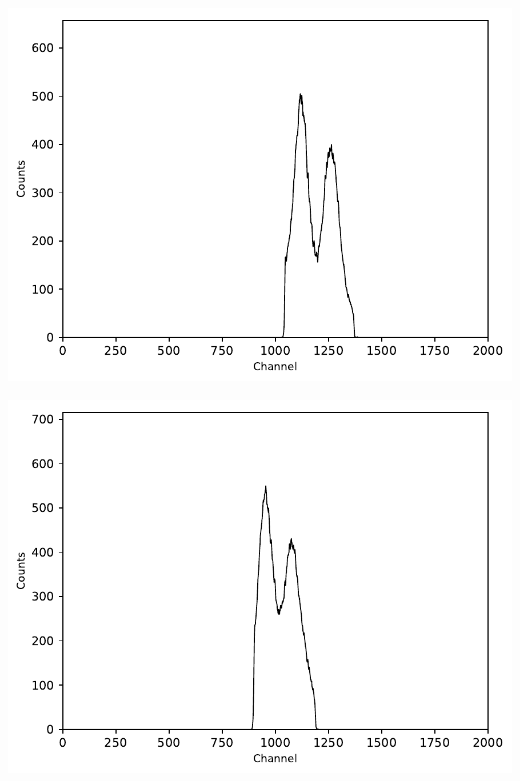 \begin{multicols}{2}
\begin{center}
\begin{adjustbox}{max width=\linewidth, keepaspectratio}
        \end{adjustbox}
        \label{fig:comptonpeak}
    \end{center}
\endminipage
%
\vspace{10mm}
%
\minipage{\linewidth}
    \begin{center}
        \captionsetup{type=figure}
        \begin{adjustbox}{max width=\linewidth, keepaspectratio}
            \includegraphics[]{pdf/60CoEnergiewindow1}
        \end{adjustbox}
        \label{fig:60CoEnergiewindow1}
    \end{center}
\endminipage
%
\vspace{10mm}
%
\minipage{\linewidth}
    \begin{center}
        \captionsetup{type=figure}
        \begin{adjustbox}{max width=\linewidth, keepaspectratio}
            \includegraphics[]{pdf/60CoEnergiewindow2}

\end{adjustbox}
\end{center}
\end{multicols}
